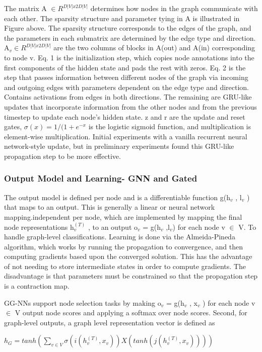 \documentclass{article}
\begin{document}
The matrix A $\in R^{D|V|x2D|V|}$ determines how nodes in the graph communicate with each other. The sparsity structure and parameter tying in A is illustrated in Figure above. The sparsity structure corresponds to the edges of the graph, and the parameters in each submatrix are determined by the edge type and direction. A$_v \in R^{D|V|x2D|V|}$ are the two columns of blocks in A(out) and A(in) corresponding to node v. Eq. 1 is the initialization step, which copies node annotations into the first components of the hidden state and pads the rest with zeros. Eq. 2 is the step that passes information between different nodes of the graph via incoming and outgoing edges with parameters dependent on the edge type and direction. Contains activations from edges in both directions. The remaining are GRU-like updates that incorporate information from the other nodes and from the previous timestep to update each node’s hidden state. z and r are the update and reset gates, $\sigma(x) = 1/(1+e^{-x}$ is the logistic sigmoid function, and multiplication is element-wise multiplication. Initial experiments with a vanilla recurrent neural network-style update, but in preliminary experiments found this GRU-like propagation step to be more effective.
\subsubsection{Output Model and Learning- GNN and Gated}
The output model is defined per node and is a differentiable function g(h$_v$ , l$_v$ ) that maps to an output. This is generally a linear or neural network mapping.independent per node, which are implemented by mapping the final node representations h$_v^{(T)}$ , to an output o$_v$ = g(h$_v$ ,l$_v$) for each node v $\in$ V. To handle graph-level classifications. Learning is done via the Almeida-Pineda algorithm, which works by running the propagation to convergence, and then computing gradients based upon the converged solution. This has the advantage of not needing to store intermediate states in order to compute gradients. The disadvantage is that parameters must be constrained so that the propagation step is a contraction map.

GG-NNs support node selection tasks by making o$_v$ = g(h$_v$ , x$_v$ ) for each node v $\in$ V output node scores and applying a softmax over node scores. Second, for graph-level outputs, a graph level representation vector is defined as

\begin{math}
h_G = tanh(\sum_{v \in V} \sigma(i(h_v^{(T)},x_v))X(tanh(j(h_v^{(T)},x_v))))
\end{math}
\end{document}
